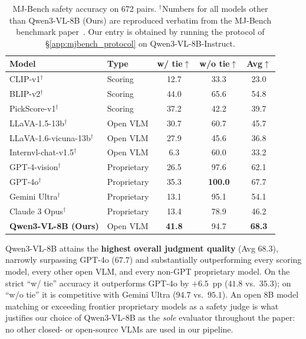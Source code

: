 \begin{table}[h]
\centering
\renewcommand{\arraystretch}{1.15}
\setlength{\tabcolsep}{0.55em}
\caption{MJ-Bench safety accuracy on 672 pairs. $^\dagger$Numbers for all models other than Qwen3-VL-8B (Ours) are reproduced verbatim from the MJ-Bench benchmark paper~\citep{chen2024mj}. Our entry is obtained by running the protocol of \S\ref{app:mjbench_protocol} on Qwen3-VL-8B-Instruct.}
\label{table:mjbench_table1}
\small
\begin{tabular}{@{}llccc@{}}
\toprule
\textbf{Model} & \textbf{Type} & \textbf{w/ tie}$\uparrow$ & \textbf{w/o tie}$\uparrow$ & \textbf{Avg}$\uparrow$ \\
\midrule
CLIP-v1$^\dagger$                & Scoring     & 12.7 & 33.3 & 23.0 \\
BLIP-v2$^\dagger$                & Scoring     & 44.0 & 65.6 & 54.8 \\
PickScore-v1$^\dagger$           & Scoring     & 37.2 & 42.2 & 39.7 \\
\midrule
LLaVA-1.5-13b$^\dagger$          & Open VLM    & 30.7 & 60.7 & 45.7 \\
LLaVA-1.6-vicuna-13b$^\dagger$   & Open VLM    & 27.9 & 45.6 & 36.8 \\
Internvl-chat-v1.5$^\dagger$     & Open VLM    &  6.3 & 60.0 & 33.2 \\
\midrule
GPT-4-vision$^\dagger$           & Proprietary & 26.5 & 97.6 & 62.1 \\
GPT-4o$^\dagger$                 & Proprietary & 35.3 & \textbf{100.0} & 67.7 \\
Gemini Ultra$^\dagger$           & Proprietary & 13.1 & 95.1 & 54.1 \\
Claude 3 Opus$^\dagger$          & Proprietary & 13.4 & 78.9 & 46.2 \\
\midrule
\rowcolor{blue!8} \textbf{Qwen3-VL-8B (Ours)} & Open VLM & \textbf{41.8} & 94.7 & \textbf{68.3} \\
\bottomrule
\end{tabular}
\end{table}

Qwen3-VL-8B attains the \textbf{highest overall judgment quality} (Avg $68.3$), narrowly surpassing GPT-4o ($67.7$) and substantially outperforming every scoring model, every other open VLM, and every non-GPT proprietary model. On the strict ``w/ tie'' accuracy it outperforms GPT-4o by $+6.5$~pp ($41.8$ vs.\ $35.3$); on ``w/o tie'' it is competitive with Gemini Ultra ($94.7$ vs.\ $95.1$). An open $8$B model matching or exceeding frontier proprietary models as a safety judge is what justifies our choice of Qwen3-VL-8B as the \emph{sole} evaluator throughout the paper: no other closed- or open-source VLMs are used in our pipeline.

